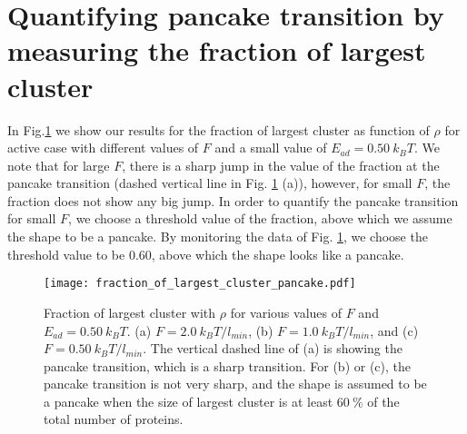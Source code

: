 \documentclass[pre,amsmath]{revtex4}
\begin{document}
\section{Quantifying pancake transition by measuring the fraction of largest cluster}
\label{sec:largest_cluster}
In Fig.\ref{largest_cluster} we show our results for the fraction of largest cluster as function of $\rho$ for active case with different values of $F$ and a small value of $E_{ad}=0.50 ~k_B T$. We note that for large $F$, there is a sharp jump in the value of the fraction at the pancake transition (dashed vertical line in Fig. \ref{largest_cluster} (a)), however, for small $F$, the fraction does not show any big jump. In order to quantify the pancake transition for small $F$, we choose a threshold value of the fraction, above which we assume the  shape to be a pancake. By monitoring the data of Fig. \ref{largest_cluster}, we choose the threshold value to be $0.60$, above which the shape looks like a pancake. 
\begin{figure}[ht]
\centering
\texttt{[image: fraction\_of\_largest\_cluster\_pancake.pdf]}
\caption{Fraction of largest cluster with $\rho$ for various values of $F$ and $E_{ad}=0.50 ~k_B T$. (a) $F=2.0 ~k_B T/l_{min}$, (b) $F=1.0 ~k_B T/l_{min}$, and (c) $F=0.50 ~k_B T/l_{min}$. The vertical dashed line of (a) is showing the pancake transition, which is a sharp transition. For (b) or (c), the pancake transition is not very sharp, and the shape is assumed to be a pancake when the size of largest cluster is at least $60 ~ \%$ of the total number of proteins.}
\label{largest_cluster} 
\end{figure}

\end{document}
